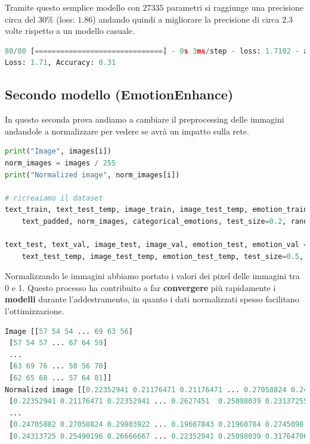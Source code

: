\documentclass{article}
\begin{document}
Tramite questo semplice modello con $27335$ parametri si raggiunge una precisione circa del $30\%$ (loss: $1.86$) andando quindi a migliorare la precisione di circa $2.3$ volte rispetto a un modello casuale.

\bigskip

\begin{lstlisting}[language=Python, caption=Risultati ottenuti modello lineare]
80/80 [==============================] - 0s 3ms/step - loss: 1.7102 - accuracy: 0.3106 - precision: 0.5093 - recall: 0.0216
Loss: 1.71, Accuracy: 0.31
\end{lstlisting}

\subsection{Secondo modello (EmotionEnhance)}
In questo seconda prova andiamo a cambiare il preprocessing delle immagini andandole a normalizzare per vedere se avrà un impatto sulla rete.
\begin{lstlisting}[language=Python, caption=Normalizzazione delle immagini]
print("Image", images[i])
norm_images = images / 255
print("Normalized image", norm_images[i])

# ricreaiamo il dataset
text_train, text_test_temp, image_train, image_test_temp, emotion_train, emotion_test_temp = train_test_split(
    text_padded, norm_images, categorical_emotions, test_size=0.2, random_state=42)

text_test, text_val, image_test, image_val, emotion_test, emotion_val = train_test_split(
    text_test_temp, image_test_temp, emotion_test_temp, test_size=0.5, random_state=42)
\end{lstlisting}

Normalizzando le immagini abbiamo portato i valori dei pixel delle immagini tra 0 e 1. Questo processo ha contribuito a far \textbf{convergere} più rapidamente i \textbf{modelli} durante l'addestramento, in quanto i dati normalizzati spesso facilitano l'ottimizzazione. 

\begin{lstlisting}[language=Python, caption=differenza immagine normalizzata]
Image [[57 54 54 ... 69 63 56]
 [57 54 57 ... 67 64 59]
 ...
 [63 69 76 ... 50 56 70]
 [62 65 68 ... 57 64 81]]
Normalized image [[0.22352941 0.21176471 0.21176471 ... 0.27058824 0.24705882 0.21960784]
 [0.22352941 0.21176471 0.22352941 ... 0.2627451  0.25098039 0.23137255]
 ...
 [0.24705882 0.27058824 0.29803922 ... 0.19607843 0.21960784 0.2745098 ]
 [0.24313725 0.25490196 0.26666667 ... 0.22352941 0.25098039 0.31764706]]
\end{lstlisting}
\end{document}
